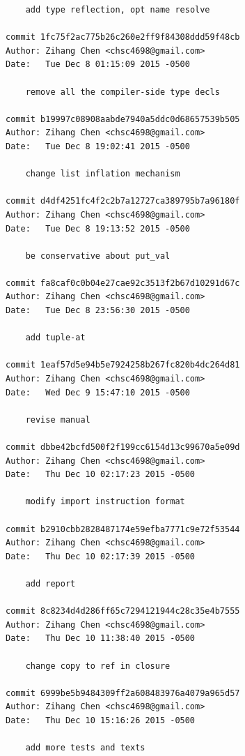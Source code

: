 \documentclass{report}
\begin{document}
\begin{appendices}
\begin{verbatim}
    add type reflection, opt name resolve

commit 1fc75f2ac775b26c260e2ff9f84308ddd59f48cb
Author: Zihang Chen <chsc4698@gmail.com>
Date:   Tue Dec 8 01:15:09 2015 -0500

    remove all the compiler-side type decls

commit b19997c08908aabde7940a5ddc0d68657539b505
Author: Zihang Chen <chsc4698@gmail.com>
Date:   Tue Dec 8 19:02:41 2015 -0500

    change list inflation mechanism

commit d4df4251fc4f2c2b7a12727ca389795b7a96180f
Author: Zihang Chen <chsc4698@gmail.com>
Date:   Tue Dec 8 19:13:52 2015 -0500

    be conservative about put_val

commit fa8caf0c0b04e27cae92c3513f2b67d10291d67c
Author: Zihang Chen <chsc4698@gmail.com>
Date:   Tue Dec 8 23:56:30 2015 -0500

    add tuple-at

commit 1eaf57d5e94b5e7924258b267fc820b4dc264d81
Author: Zihang Chen <chsc4698@gmail.com>
Date:   Wed Dec 9 15:47:10 2015 -0500

    revise manual

commit dbbe42bcfd500f2f199cc6154d13c99670a5e09d
Author: Zihang Chen <chsc4698@gmail.com>
Date:   Thu Dec 10 02:17:23 2015 -0500

    modify import instruction format

commit b2910cbb2828487174e59efba7771c9e72f53544
Author: Zihang Chen <chsc4698@gmail.com>
Date:   Thu Dec 10 02:17:39 2015 -0500

    add report

commit 8c8234d4d286ff65c7294121944c28c35e4b7555
Author: Zihang Chen <chsc4698@gmail.com>
Date:   Thu Dec 10 11:38:40 2015 -0500

    change copy to ref in closure

commit 6999be5b9484309ff2a608483976a4079a965d57
Author: Zihang Chen <chsc4698@gmail.com>
Date:   Thu Dec 10 15:16:26 2015 -0500

    add more tests and texts
\end{verbatim}

\end{appendices}
\end{document}
